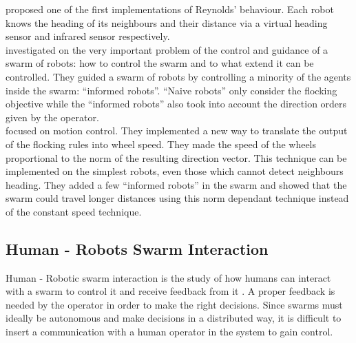 \documentclass[oneside, a4paper, 12pt]{memoir}
\begin{document}
		\citet{turgut2008self} proposed one of the first implementations of Reynolds' \citep{reynolds1987flocks} behaviour. Each robot knows the heading of its neighbours and their distance via a virtual heading sensor and infrared sensor respectively.\\
		\citet{ccelikkanat2010steering} investigated on the very important problem of the control and guidance of a swarm of robots: how to control the swarm and to what extend it can be controlled. They guided a swarm of robots by controlling a minority of the agents inside the swarm: \enquote{informed robots}. \enquote{Naive robots} only consider the flocking objective while the \enquote{informed robots} also took into account the direction orders given by the operator.\\
		\citet{ferrante2012self} focused on motion control. They implemented a new way to translate the output of the flocking rules into wheel speed. They made the speed of the wheels proportional to the norm of the resulting direction vector. This technique can be implemented on the simplest robots, even those which cannot detect neighbours heading. They added a few \enquote{informed robots} in the swarm and showed that the swarm could travel longer distances using this norm dependant technique instead of the constant speed technique.
					
	\subsection{Human - Robots Swarm Interaction}

	
	Human - Robotic swarm interaction is the study of how humans can interact with a swarm to control it and receive feedback from it \citep{brambilla2013swarm}. A proper feedback is needed by the operator in order to make the right decisions. Since swarms must ideally be autonomous and make decisions in a distributed way, it is difficult to insert a communication with a human operator in the system to gain control.
	
\end{document}
